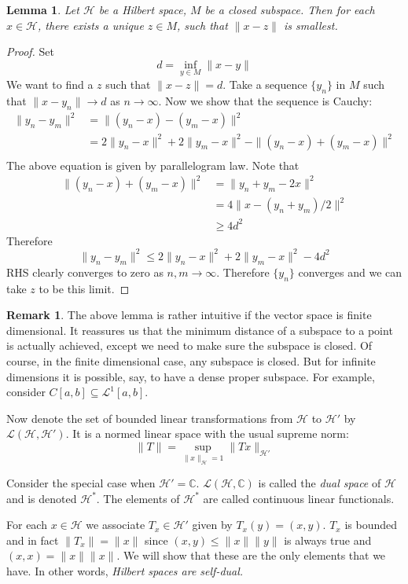 \documentclass[12pt]{article}
\theoremstyle{plain}
\newtheorem{lemma}[equation]{Lemma}
\theoremstyle{definition}
\newtheorem{remark}[equation]{Remark}
\theoremstyle{named}
\newcommand{\sL}{\mathcal{L}}
\newcommand{\shH}{\mathscr{H}}
\newcommand{\shL}{\mathscr{L}}
\newcommand{\<}{\langle}
\renewcommand{\>}{\rangle}
\newcommand{\IC}{\mathbb{C}}
\begin{document}
\begin{lemma}
Let $\shH$ be a Hilbert space, $M$ be a closed subspace. Then for each $x \in \shH$, there exists a unique $z \in M$, such that $\| x - z \|$ is smallest. 
\end{lemma}
\begin{proof}
Set 
$$ d = \inf_{y \in M} \| x - y \| $$
We want to find a $z$ such that $\| x - z \| = d$. Take a sequence $\{ y_n \}$ in $M$ such that $\| x - y_n \| \to d$ as $n \to \infty$. Now we show that the sequence is Cauchy:
\begin{align*}
\| y_n - y_m \|^2 &= \| ( y_n - x) - (y_m  - x) \|^2\\
&= 2 \| y_n - x \|^2 + 2 \| y_m - x \|^2 - \| (y_n - x) + (y_m - x) \|^2 \\
\end{align*}
The above equation is given by parallelogram law. 
Note that 
\begin{align*}
\| (y_n - x) + (y_m - x) \|^2  &= \| y_n + y_m - 2x \|^2 \\
&= 4 \| x - (y_n + y_m)/2 \|^2 \\
&\ge 4d^2
\end{align*}
Therefore 
$$ \| y_n - y_m \|^2 \le 2 \| y_n - x \|^2 + 2 \| y_m - x \|^2 - 4d^2 $$
RHS clearly converges to zero as $n, m \to \infty$. Therefore $\{y_n\}$ converges and we can take $z$ to be this limit.  
\end{proof}

\begin{remark}
The above lemma is rather intuitive if the vector space is finite dimensional. It reassures us that the minimum distance of a subspace to a point is actually achieved, except we need to make sure the subspace is closed. Of course, in the finite dimensional case, any subspace is closed. But for infinite dimensions it is possible, say, to have a dense proper subspace. For example, consider $C[a, b] \subseteq \sL^1[a, b]$. 
\end{remark}

Now denote the set of bounded linear transformations from $\shH$ to $\shH'$ by $\shL(\shH, \shH')$. It is a normed linear space with the usual supreme norm:
$$ \| T \| = \sup_{\|x \|_\shH = 1} \| T x \|_{\shH'} $$

Consider the special case when $\shH' = \IC$. $\shL(\shH, \IC)$ is called the \textit{dual space} of $\shH$ and is denoted $\shH^*$. The elements of $\shH^*$ are called continuous linear functionals. 

For each $x \in \shH$ we associate $T_x \in \shH'$ given by $T_x(y) = (x, y)$. $T_x$ is bounded and in fact $\| T_x \| = \| x \|$ since $(x, y) \le \| x \| \|y \|$ is always true and $(x, x) = \| x \| \| x \|$. We will show that these are the only elements that we have. In other words, \textit{Hilbert spaces are self-dual.}
\end{document}
